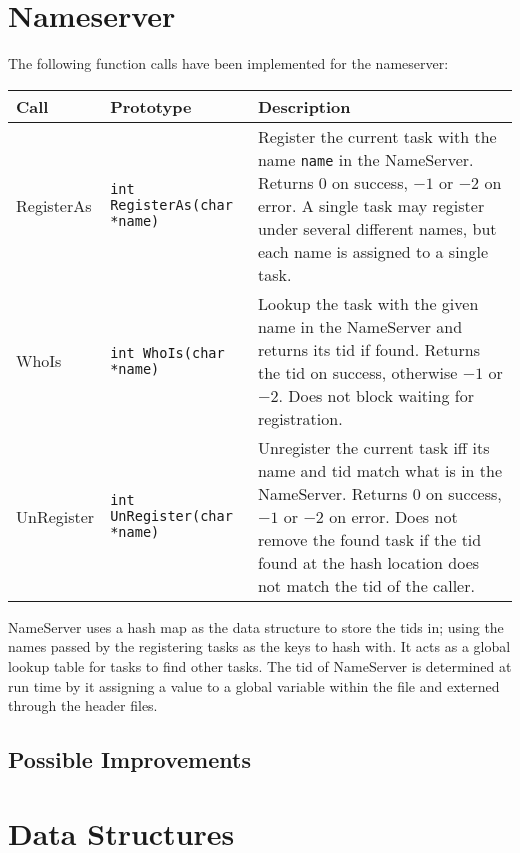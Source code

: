 \documentclass[12pt]{article}
\begin{document}
\section{Nameserver}
The following function calls have been implemented for the nameserver:
\begin{center}
  \begin{tabular}{|l|l|p{8cm}|}
    \hline
    {\bf Call} & {\bf Prototype} & {\bf Description} \\\hline
    RegisterAs & \texttt{int RegisterAs(char *name)} & Register the current task with the name \texttt{name} in the NameServer.  Returns $0$ on success, $-1$ or $-2$ on error. A single task may register under several different names, but each name is assigned to a single task.\\\hline
    WhoIs & \texttt{int WhoIs(char *name)} & Lookup the task with the given name in the NameServer and returns its tid if found.  Returns the tid on success, otherwise $-1$ or $-2$.  Does not block waiting for registration.\\\hline
    UnRegister & \texttt{int UnRegister(char *name)} & Unregister the current task iff its name and tid match what is in the NameServer.  Returns $0$ on success, $-1$ or $-2$ on error.  Does not remove the found task if the tid found at the hash location does not match the tid of the caller.\\\hline
  \end{tabular}
\end{center}
NameServer uses a hash map as the data structure to store the tids in; using the names passed by the registering tasks as the keys to hash with.  It acts as a global lookup table for tasks to find other tasks.  The tid of NameServer is determined at run time by it assigning a value to a global variable within the file and externed through the header files.
\\[1\baselineskip]

\subsection{Possible Improvements}

\section{Data Structures}
\end{document}
